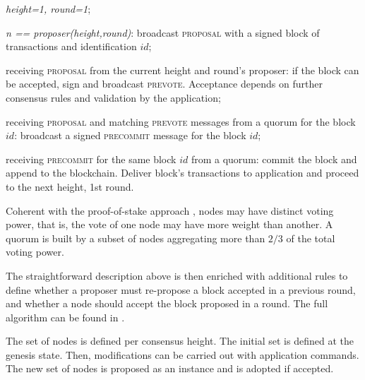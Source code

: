   


\begin{description}[align=left]
\item[init] \textit{height=1, round=1};
\item[upon] \textit{n == proposer(height,round)}: broadcast \textsc{proposal} 
with a signed block of transactions and identification $id$;
\item[upon] receiving \textsc{proposal} from the current height and round's proposer: if the block can be accepted, sign and broadcast \textsc{prevote}.  Acceptance depends on further consensus rules and validation by the application;
\item[upon] receiving \textsc{proposal} and matching \textsc{prevote} messages from a quorum for the block $id$: broadcast a signed \textsc{precommit} message for the block $id$;
\item[upon] receiving \textsc{precommit} for the same block $id$ from a quorum: commit the block and append to the blockchain.   Deliver block's transactions to application and proceed to the next height, 1st round.  
\end{description}

Coherent with the proof-of-stake approach \cite{Poelstra2015DistributedCF}, nodes may have distinct voting power, that is, the vote of one node may have more weight than another.
A quorum is built by a subset of nodes aggregating more than $2/3$ of the total voting power.  

The straightforward description above is then enriched with additional rules to define whether a proposer must re-propose a block accepted in a previous round, and whether a node should accept the block proposed in a round.  The full algorithm can be found in \cite{buchman2019latestgossipbftconsensus}. 


The set of nodes is defined per consensus height.  The initial set is defined at the genesis state.  Then, modifications can be carried out with application commands.  The new set of nodes is proposed as an instance and is adopted if accepted.



